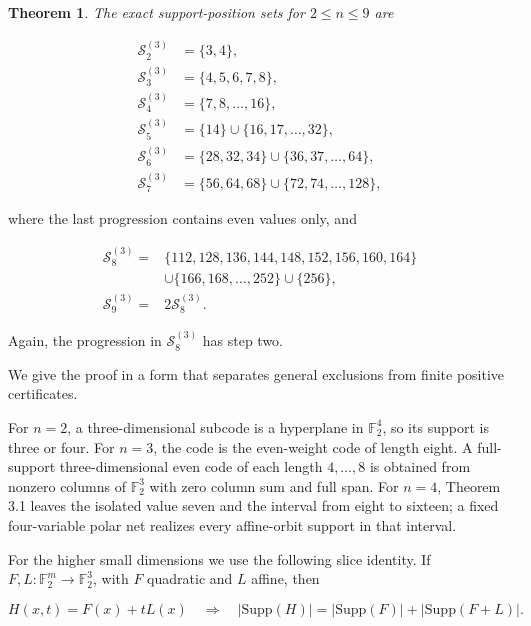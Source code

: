 \documentclass[11pt]{article}
\newtheorem{theorem}{Theorem}[section]
\theoremstyle{remark}
\numberwithin{equation}{section}
\begin{document}
\Needspace{0.23\textheight}
\begin{theorem}
The exact support-position sets for \(2\le n\le9\) are
\end{theorem}


\[
\begin{aligned}
\mathcal S_2^{(3)}&=\{3,4\},\\
\mathcal S_3^{(3)}&=\{4,5,6,7,8\},\\
\mathcal S_4^{(3)}&=\{7,8,\ldots,16\},\\
\mathcal S_5^{(3)}&=\{14\}\cup\{16,17,\ldots,32\},\\
\mathcal S_6^{(3)}&=\{28,32,34\}\cup\{36,37,\ldots,64\},\\
\mathcal S_7^{(3)}&=\{56,64,68\}\cup\{72,74,\ldots,128\},
\end{aligned}                                                    \tag{3.3}
\]

where the last progression contains even values only, and

\[
\begin{aligned}
\mathcal S_8^{(3)}={}&
\{112,128,136,144,148,152,156,160,164\}\\
&\cup\{166,168,\ldots,252\}\cup\{256\},\\
\mathcal S_9^{(3)}={}&2\mathcal S_8^{(3)}.
\end{aligned}                                                    \tag{3.4}
\]

Again, the progression in \(\mathcal S_8^{(3)}\) has step two.

We give the proof in a form that separates general exclusions from finite
positive certificates.

For \(n=2\), a three-dimensional subcode is a hyperplane in
\(\mathbb F_2^4\), so its support is three or four. For \(n=3\), the code is the
even-weight code of length eight. A full-support three-dimensional even code
of each length \(4,\ldots,8\) is obtained from nonzero columns of
\(\mathbb F_2^3\) with zero column sum and full span. For \(n=4\), Theorem 3.1
leaves the isolated value seven and the interval from eight to sixteen; a
fixed four-variable polar net realizes every affine-orbit support in that
interval.

For the higher small dimensions we use the following slice identity. If
\(F,L:\mathbb F_2^m\to\mathbb F_2^3\), with \(F\) quadratic and \(L\) affine,
then

\[
H(x,t)=F(x)+tL(x)
\quad\Longrightarrow\quad
|\mathrm{Supp}(H)|=|\mathrm{Supp}(F)|+|\mathrm{Supp}(F+L)|.       \tag{3.5}
\]
\end{document}
